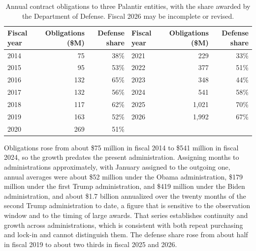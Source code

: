 \documentclass[12pt]{article}
\theoremstyle{remark}
\begin{document}
\begin{table}[ht]
\centering
\small
\setlength{\tabcolsep}{6pt}
\begin{tabular}{lrrlrr}
\hline
Fiscal year & Obligations (\$M) & Defense share & Fiscal year & Obligations (\$M) & Defense share \\
\hline
2014 & 75 & 38\% & 2021 & 229 & 33\% \\
2015 & 95 & 53\% & 2022 & 377 & 51\% \\
2016 & 132 & 65\% & 2023 & 348 & 44\% \\
2017 & 132 & 56\% & 2024 & 541 & 58\% \\
2018 & 117 & 62\% & 2025 & 1,021 & 70\% \\
2019 & 163 & 52\% & 2026 & 1,992 & 67\% \\
2020 & 269 & 51\% & & & \\
\hline
\end{tabular}
\caption{Annual contract obligations to three Palantir entities, with the share awarded by the Department of Defense. Fiscal 2026 may be incomplete or revised.}
\label{tab:awards}
\end{table}

Obligations rose from about \$75 million in fiscal 2014 to \$541 million in fiscal 2024, so the growth predates the present administration. Assigning months to administrations approximately, with January assigned to the outgoing one, annual averages were about \$52 million under the Obama administration, \$179 million under the first Trump administration, and \$419 million under the Biden administration, and about \$1.7 billion annualized over the twenty months of the second Trump administration to date, a figure that is sensitive to the observation window and to the timing of large awards. That series establishes continuity and growth across administrations, which is consistent with both repeat purchasing and lock-in and cannot distinguish them. The defense share rose from about half in fiscal 2019 to about two thirds in fiscal 2025 and 2026.
\end{document}
